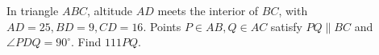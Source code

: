 In triangle $ABC$, altitude $AD$ meets the interior of $BC$, with $AD=25,BD=9,CD=16$. Points $P\in AB,Q\in AC$ satisfy $PQ\parallel BC$ and $\angle PDQ=90^\circ$. Find $111PQ$.
